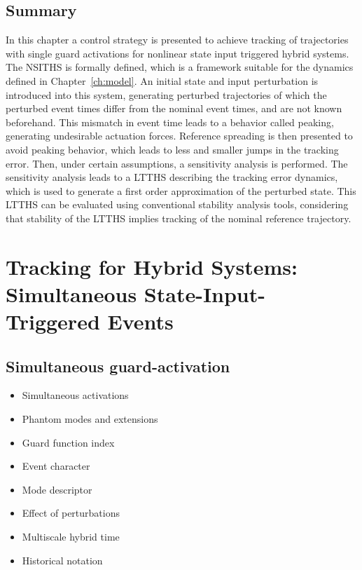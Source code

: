 \documentclass[../DC2017114Bouma.tex]{subfiles}
\begin{document}
\section{Summary}
In this chapter a control strategy is presented to achieve tracking of trajectories with single guard activations for nonlinear state input triggered hybrid systems. The NSITHS is formally defined, which is a framework suitable for the dynamics defined in Chapter~\ref{ch:model}. An initial state and input perturbation is introduced into this system, generating perturbed trajectories of which the perturbed event times differ from the nominal event times, and are not known beforehand. This mismatch in event time leads to a behavior called peaking, generating undesirable actuation forces. Reference spreading is then presented to avoid peaking behavior, which leads to less and smaller jumps in the tracking error. Then, under certain assumptions, a sensitivity analysis is performed. The sensitivity analysis leads to a LTTHS describing the tracking error dynamics, which is used to generate a first order approximation of the perturbed state. This LTTHS can be evaluated using conventional stability analysis tools, considering that stability of the LTTHS implies tracking of the nominal reference trajectory.
\cleartooddpage
\chapter{Tracking for Hybrid Systems: Simultaneous State-Input-Triggered Events}\label{ch:simult}
\cite{Rijnen2018}
\section{Simultaneous guard-activation}
\begin{itemize}
\item Simultaneous activations
\item Phantom modes and extensions
\item Guard function index
\item Event character
\item Mode descriptor
\item Effect of perturbations
\item Multiscale hybrid time
\item Historical notation
\end{itemize}
%
%
%
%
%
%
%
%
%
\end{document}
